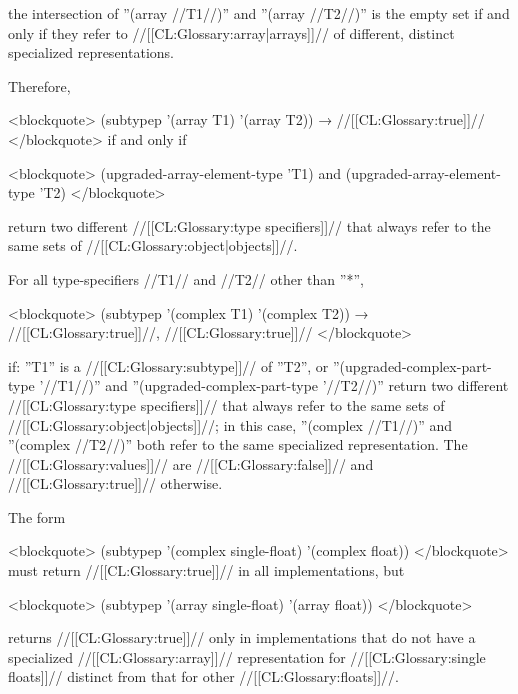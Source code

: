 the intersection of ''(array //T1//)'' and ''(array //T2//)'' is the empty set if and only if they refer to //[[CL:Glossary:array|arrays]]// of different, distinct specialized representations.

Therefore,

<blockquote> (subtypep '(array T1) '(array T2)) → //[[CL:Glossary:true]]// </blockquote> if and only if

<blockquote> (upgraded-array-element-type 'T1) and (upgraded-array-element-type 'T2) </blockquote>

return two different //[[CL:Glossary:type specifiers]]// that always refer to the same sets of //[[CL:Glossary:object|objects]]//.

For all type-specifiers //T1// and //T2// other than ''*'',

<blockquote> (subtypep '(complex T1) '(complex T2)) → //[[CL:Glossary:true]]//, //[[CL:Glossary:true]]// </blockquote>

if: \beginlist {} ''T1'' is a //[[CL:Glossary:subtype]]// of ''T2'', or  ''(upgraded-complex-part-type '//T1//)'' and ''(upgraded-complex-part-type '//T2//)'' return two different //[[CL:Glossary:type specifiers]]// that always refer to the same sets of //[[CL:Glossary:object|objects]]//; in this case, ''(complex //T1//)'' and ''(complex //T2//)'' both refer to the same specialized representation. \endlist The //[[CL:Glossary:values]]// are //[[CL:Glossary:false]]// and //[[CL:Glossary:true]]// otherwise.

The form

<blockquote> (subtypep '(complex single-float) '(complex float)) </blockquote> must return //[[CL:Glossary:true]]// in all implementations, but

<blockquote> (subtypep '(array single-float) '(array float)) </blockquote>

returns //[[CL:Glossary:true]]// only in implementations that do not have a specialized //[[CL:Glossary:array]]// representation for //[[CL:Glossary:single floats]]// distinct from that for other //[[CL:Glossary:floats]]//.



